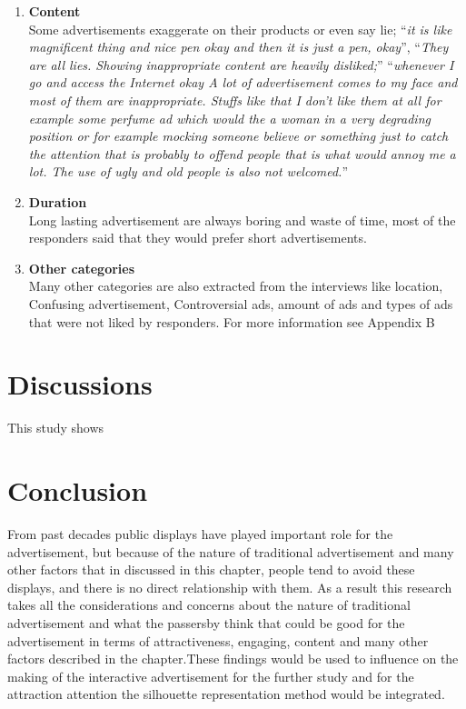 \begin{enumerate}
\item \textbf{Content} \\
Some advertisements exaggerate on their products or even say lie; ``\emph{it is like magnificent thing and nice pen okay and then it is just a pen, okay}'', ``\emph{They are all lies. Showing inappropriate content are heavily disliked;}'' ``\emph{whenever I go and access the Internet okay A lot of advertisement comes to my face and most of them are inappropriate.
Stuffs like that I don't like them at all for example some perfume ad which would the a woman in a very degrading position or for example mocking someone believe or something just to catch the attention that is probably to offend people that is what would annoy me a lot. The use of ugly and old people is also not welcomed.}''

\item \textbf{Duration} \\
Long lasting advertisement are always boring and waste of time, most of the responders said that they would prefer short advertisements.

\item \textbf{Other categories} \\
Many other categories are also extracted from the interviews like location, Confusing advertisement, Controversial ads, amount of ads and types of ads that were not liked by responders. For more information see Appendix B

\end{enumerate}

\newpage
\section{Discussions}
This study shows



\section{Conclusion} 
From past decades public displays have played important role for the advertisement, but because of the nature of traditional advertisement and many other factors that in discussed in this chapter, people tend to avoid these displays, and there is no direct relationship with them.
As a result this research takes all the considerations and concerns about the nature of traditional advertisement and what the passersby think that could be good for the advertisement in terms of attractiveness, engaging, content and many other factors described in the chapter.These findings would be used to influence on the making of the interactive advertisement for the further study and for the attraction attention the silhouette representation method would be integrated.

